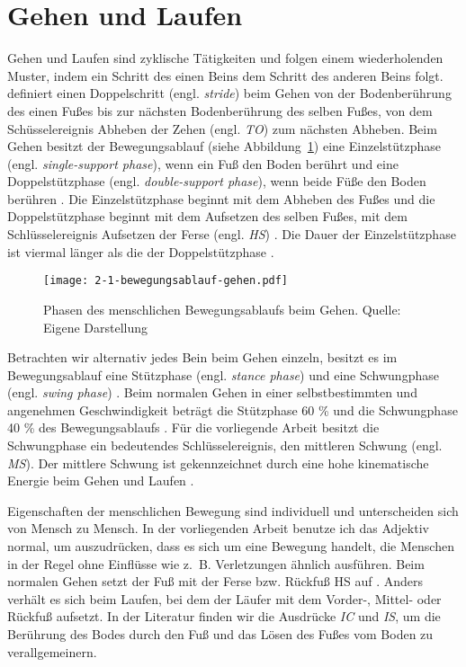 \section{Gehen und Laufen}
\label{sec:gehen_und_laufen}

Gehen und Laufen sind zyklische Tätigkeiten und folgen einem wiederholenden Muster, indem ein Schritt des einen Beins dem Schritt des anderen Beins folgt. \citet[][S.~9]{Bartlett2007} definiert einen Doppelschritt (engl. \emph{stride}) beim Gehen von der Bodenberührung des einen Fußes bis zur nächsten Bodenberührung des selben Fußes, von dem Schüsselereignis Abheben der Zehen (engl. \emph{\ac{TO}}) zum nächsten Abheben. Beim Gehen besitzt der Bewegungsablauf (siehe Abbildung~\ref{fig:2_1_bewegungsablauf_gehen}) eine Einzelstützphase (engl. \emph{single-support phase}), wenn ein Fuß den Boden berührt und eine Doppelstützphase (engl. \emph{double-support phase}), wenn beide Füße den Boden berühren \citep[vgl.][]{Bartlett2007}. Die Einzelstützphase beginnt mit dem Abheben des Fußes und die Doppelstützphase beginnt mit dem Aufsetzen des selben Fußes, mit dem Schlüsselereignis Aufsetzen der Ferse (engl. \emph{\ac{HS}}) \citep[vgl.][]{Bartlett2007}. Die Dauer der Einzelstützphase ist viermal länger als die der Doppelstützphase \citep[vgl.][]{Bartlett2007}.

\begin{figure}[t]
	\centering
		\texttt{[image: 2-1-bewegungsablauf-gehen.pdf]}
	\caption[Phasen des menschlichen Bewegungsablaufs beim Gehen]{Phasen des menschlichen Bewegungsablaufs beim Gehen. Quelle: Eigene Darstellung}
	\label{fig:2_1_bewegungsablauf_gehen}
\end{figure}

Betrachten wir alternativ jedes Bein beim Gehen einzeln, besitzt es im Bewegungsablauf eine Stützphase (engl. \emph{stance phase}) und eine Schwungphase (engl. \emph{swing phase}) \citep[vgl.][]{Bartlett2007}. Beim normalen Gehen in einer selbstbestimmten und angenehmen Geschwindigkeit beträgt die Stützphase 60 \% und die Schwungphase 40 \% des Bewegungsablaufs \citep[vgl.][]{Bartlett2007}. Für die vorliegende Arbeit besitzt die Schwungphase ein bedeutendes Schlüsselereignis, den mittleren Schwung (engl. \emph{\ac{MS}}). Der mittlere Schwung ist gekennzeichnet durch eine hohe kinematische Energie beim Gehen und Laufen \citep[vgl.][]{Novacheck1998}.

Eigenschaften der menschlichen Bewegung sind individuell und unterscheiden sich von Mensch zu Mensch. In der vorliegenden Arbeit benutze ich das Adjektiv normal, um auszudrücken, dass es sich um eine Bewegung handelt, die Menschen in der Regel ohne Einflüsse wie z.~B. Verletzungen ähnlich ausführen. Beim normalen Gehen setzt der Fuß mit der Ferse bzw. Rückfuß \ac{HS} auf \citep[vgl.][S.~33]{Marquardt2011}. Anders verhält es sich beim Laufen, bei dem der Läufer mit dem Vorder-, Mittel- oder Rückfuß aufsetzt. In der Literatur finden wir die Ausdrücke \emph{\ac{IC}} und \emph{\ac{IS}}, um die Berührung des Bodes durch den Fuß und das Lösen des Fußes vom Boden zu verallgemeinern.


